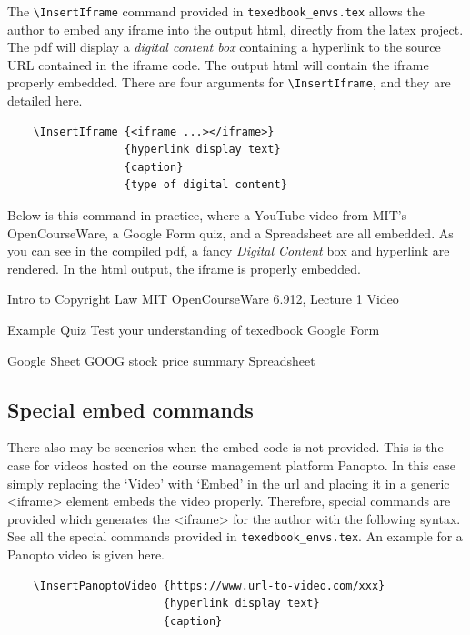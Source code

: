 \documentclass{article}
\begin{document}
The \verb'\InsertIframe' command provided in \verb'texedbook_envs.tex' allows the author to embed any iframe into the output html, directly from the latex project. The pdf will display a \textit{digital content box} containing a hyperlink to the source URL contained in the iframe code. The output html will contain the iframe properly embedded. There are four arguments for \verb'\InsertIframe', and they are detailed here.
\begin{verbatim}
    \InsertIframe {<iframe ...></iframe>}
                  {hyperlink display text}
                  {caption}
                  {type of digital content}
\end{verbatim}  

Below is this command in practice, where a YouTube video from MIT's OpenCourseWare, a Google Form quiz, and a Spreadsheet are all embedded. As you can see in the compiled pdf, a fancy \textit{Digital Content} box and hyperlink are rendered. In the html output, the iframe is properly embedded.

             {Intro to Copyright Law}
             {MIT OpenCourseWare 6.912, Lecture 1}
             {Video} 

             {Example Quiz}
             {Test your understanding of texedbook}
             {Google Form}

             {Google Sheet}
             {GOOG stock price summary}
             {Spreadsheet}

\subsection{Special embed commands}
There also may be scenerios when the embed code is not provided. This is the case for videos hosted on the course management platform Panopto. In this case simply replacing the `Video' with `Embed' in the url and placing it in a generic <iframe> element embeds the video properly. Therefore, special commands are provided which generates the <iframe> for the author with the following syntax. See all the special commands provided in \verb'texedbook_envs.tex'. An example for a Panopto video is given here.
\begin{verbatim}
    \InsertPanoptoVideo {https://www.url-to-video.com/xxx}
                        {hyperlink display text}
                        {caption}
\end{verbatim}  
\end{document}
